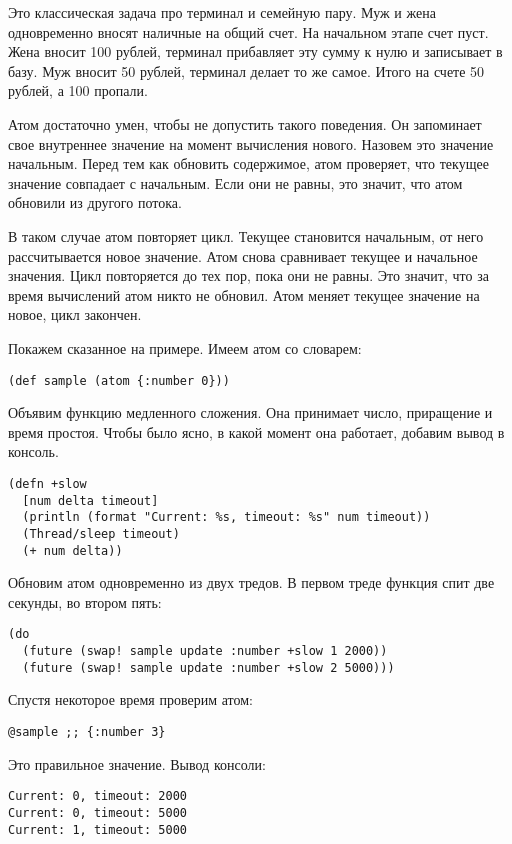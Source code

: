 Это классическая задача про терминал и семейную пару. Муж и жена одновременно
вносят наличные на общий счет. На начальном этапе счет пуст. Жена вносит 100
рублей, терминал прибавляет эту сумму к нулю и записывает в базу. Муж вносит 50
рублей, терминал делает то же самое. Итого на счете 50 рублей, а 100 пропали.

Атом достаточно умен, чтобы не допустить такого поведения. Он запоминает свое
внутреннее значение на момент вычисления нового. Назовем это значение
начальным. Перед тем как обновить содержимое, атом проверяет, что текущее
значение совпадает с начальным. Если они не равны, это значит, что атом обновили
из другого потока.

В таком случае атом повторяет цикл. Текущее становится начальным, от него
рассчитывается новое значение. Атом снова сравнивает текущее и начальное
значения. Цикл повторяется до тех пор, пока они не равны. Это значит, что за
время вычислений атом никто не обновил. Атом меняет текущее значение на новое,
цикл закончен.

Покажем сказанное на примере. Имеем атом со словарем:

\begin{verbatim}
(def sample (atom {:number 0}))
\end{verbatim}

Объявим функцию медленного сложения. Она принимает число, приращение и время
простоя. Чтобы было ясно, в какой момент она работает, добавим вывод в консоль.

\begin{verbatim}
(defn +slow
  [num delta timeout]
  (println (format "Current: %s, timeout: %s" num timeout))
  (Thread/sleep timeout)
  (+ num delta))
\end{verbatim}

Обновим атом одновременно из двух тредов. В первом треде функция спит две
секунды, во втором пять:

\begin{verbatim}
(do
  (future (swap! sample update :number +slow 1 2000))
  (future (swap! sample update :number +slow 2 5000)))
\end{verbatim}

Спустя некоторое время проверим атом:

\begin{verbatim}
@sample ;; {:number 3}
\end{verbatim}

Это правильное значение. Вывод консоли:

\begin{verbatim}
Current: 0, timeout: 2000
Current: 0, timeout: 5000
Current: 1, timeout: 5000
\end{verbatim}


